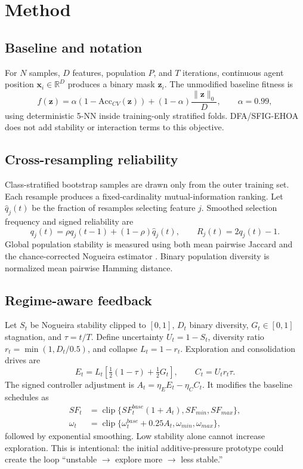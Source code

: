 \documentclass[11pt]{article}
\begin{document}
\section{Method}
\subsection{Baseline and notation}
For $N$ samples, $D$ features, population $P$, and $T$ iterations, continuous
agent position $\mathbf{x}_i\in\mathbb{R}^{D}$ produces a binary mask
$\mathbf{z}_i$. The unmodified baseline fitness is
\begin{equation}
 f(\mathbf{z})=\alpha(1-\mathrm{Acc}_{CV}(\mathbf{z}))
 +(1-\alpha)\frac{\lVert\mathbf{z}\rVert_0}{D}, \qquad \alpha=0.99,
\end{equation}
using deterministic 5-NN inside training-only stratified folds. DFA/SFIG-EHOA
does not add stability or interaction terms to this objective.

\subsection{Cross-resampling reliability}
Class-stratified bootstrap samples are drawn only from the outer training set.
Each resample produces a fixed-cardinality mutual-information ranking. Let
$\widehat q_j(t)$ be the fraction of resamples selecting feature $j$. Smoothed
selection frequency and signed reliability are
\begin{equation}
 q_j(t)=\rho q_j(t-1)+(1-\rho)\widehat q_j(t), \qquad R_j(t)=2q_j(t)-1.
\end{equation}
Global population stability is measured using both mean pairwise Jaccard and
the chance-corrected Nogueira estimator \cite{nogueira2018stability}. Binary
population diversity is normalized mean pairwise Hamming distance.

\subsection{Regime-aware feedback}
Let $S_t$ be Nogueira stability clipped to $[0,1]$, $D_t$ binary diversity,
$G_t\in[0,1]$ stagnation, and $\tau=t/T$. Define uncertainty
$U_t=1-S_t$, diversity ratio $r_t=\min(1,D_t/0.5)$, and collapse
$L_t=1-r_t$. Exploration and consolidation drives are
\begin{equation}
 E_t=L_t\left[\tfrac12(1-\tau)+\tfrac12G_t\right], \qquad
 C_t=U_t r_t\tau .
\end{equation}
The signed controller adjustment is $A_t=\eta_EE_t-\eta_CC_t$. It modifies
the baseline schedules as
\begin{align}
 SF_t &= \operatorname{clip}\{SF_t^{base}(1+A_t),SF_{min},SF_{max}\},\\
 \omega_t &= \operatorname{clip}\{\omega_t^{base}+0.25A_t,
 \omega_{min},\omega_{max}\},
\end{align}
followed by exponential smoothing. Low stability alone cannot increase
exploration. This is intentional: the initial additive-pressure prototype could
create the loop ``unstable $\rightarrow$ explore more $\rightarrow$ less
stable.''
\end{document}
